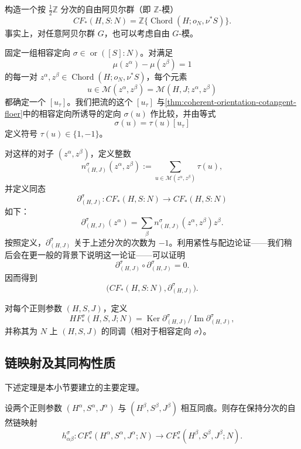 构造一个按 $\frac12\mathbb Z$ 分次的自由阿贝尔群（即 $\mathbb Z$-模）
\[
  CF_*(H,S:N)
  =\mathbb Z\{\operatorname{Chord}(H;o_N,\nu^*S)\}.
\]
事实上，对任意阿贝尔群 $G$，也可以考虑自由 $G$-模。

固定一组相容定向 $\sigma\in\operatorname{or}([S]:N)$。对满足
\[
  \mu(z^\alpha)-\mu(z^\beta)=1
\]
的每一对 $z^\alpha,z^\beta\in\operatorname{Chord}(H;o_N,\nu^*S)$，每个元素
\[
  u\in\mathcal M(z^\alpha,z^\beta)
  =\mathcal M(H,J;z^\alpha,z^\beta)
\]
都确定一个 $[u_\tau]$。我们把流的这个 $[u_\tau]$ 与\cref{thm:coherent-orientation-cotangent-floer}中的相容定向所诱导的定向 $\sigma(u)$ 作比较，并由等式
\[
  \sigma(u)=\tau(u)[u_\tau]
\]
定义符号 $\tau(u)\in\{1,-1\}$。

对这样的对子 $(z^\alpha,z^\beta)$，定义整数
\begin{equation}
  n_{(H,J)}^\sigma(z^\alpha,z^\beta)
  :=\sum_{u\in\mathcal M(z^\alpha,z^\beta)}\tau(u),
\label{eq:signed-count-floer-trajectories}
\end{equation}
并定义同态
\[
  \partial_{(H,J)}^\sigma:CF_*(H,S:N)\longrightarrow CF_*(H,S:N)
\]
如下：
\[
  \partial_{(H,J)}^\sigma(z^\alpha)
  =\sum_\beta n_{(H,J)}^\sigma(z^\alpha,z^\beta)z^\beta.
\]
按照定义，$\partial_{(H,J)}^\sigma$ 关于上述分次的次数为 $-1$。利用紧性与配边论证——我们稍后会在更一般的背景下说明这一论证——可以证明
\[
  \partial_{(H,J)}^\sigma\circ\partial_{(H,J)}^\sigma=0.
\]
因而得到\termGradedComplex{}
\[
  \bigl(CF_*(H,S:N),\partial_{(H,J)}^\sigma\bigr).
\]

\begin{definition}
\label{def:cotangent-floer-homology}
对每个\personFloer{}正则参数 $(H,S,J)$，定义
\[
  HF_*^\sigma(H,S,J;N)
  =\operatorname{Ker}\partial_{(H,J)}^\sigma
   /\operatorname{Im}\partial_{(H,J)}^\sigma,
\]
并称其为 $N$ 上 $(H,S,J)$ 的\personFloer{}同调（相对于相容定向 $\sigma$）。
\end{definition}

\subsection{链映射及其同构性质}
\label{subsec:chain-map-isomorphism}

下述定理是本小节要建立的主要定理。

\begin{theorem}
\label{thm:continuation-chain-map-cotangent}
设两个正则参数 $(H^\alpha,S^\alpha,J^\alpha)$ 与 $(H^\beta,S^\beta,J^\beta)$ 相互同痕。则存在保持分次的\mbox{自然链映射}
\[
  h_{\alpha\beta}^\sigma:
  CF_*^\sigma(H^\alpha,S^\alpha,J^\alpha;N)
  \longrightarrow
  CF_*^\sigma(H^\beta,S^\beta,J^\beta;N).
\]
\end{theorem}

